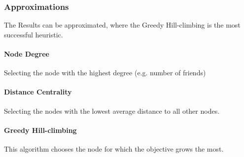 \subsubsection{Approximations} %
\label{ssub:approximations}
The Results can be approximated,
where the Greedy Hill-climbing is the most successful heuristic.

	\paragraph{Node Degree} %
	\label{par:node_degree}
	Selecting the node with the highest degree (e.g. number of friends)
	\paragraph{Distance Centrality} %
	\label{par:distance_centrality}
	Selecting the nodes with the lowest average distance to all other nodes.
	\paragraph{Greedy Hill-climbing} %
	\label{par:greedy_hill_climbing}
This algorithm chooses the node for which the objective grows the most.

